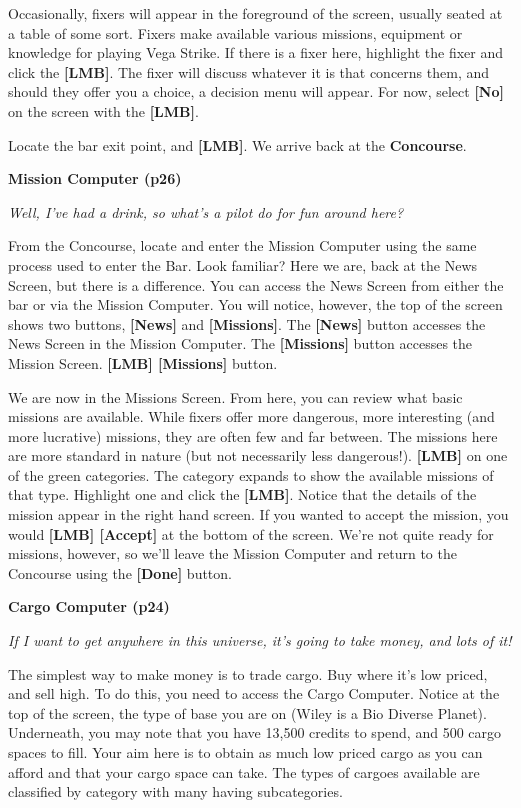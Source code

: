 \documentclass{article}
\begin{document}
Occasionally, fixers will appear in the foreground of the screen, usually seated at a table of some sort. Fixers make available various missions, equipment or knowledge for playing Vega Strike. If there is a fixer here, highlight the fixer and click the \textbf{[LMB]}. The fixer will discuss whatever it is that concerns them, and should they offer you a choice, a decision menu will appear.  For now, select \textbf{[No] }on the screen with the \textbf{[LMB]}. 

Locate the bar exit point, and \textbf{[LMB]}. We arrive back at the \textbf{Concourse}. 

\textbf{}

\textbf{Mission Computer (p26) }

\textit{Well, I've had a drink, so what's a pilot do for fun around here? }

From the Concourse, locate and enter the Mission Computer using the same process used to enter the Bar. Look familiar? Here we are, back at the News Screen, but there is a difference. You can access the News Screen from either the bar or via the Mission Computer. You will notice, however, the top of the screen shows two buttons, \textbf{[News] }and \textbf{[Missions]}. The \textbf{[News] }button accesses the News Screen in the Mission Computer. The \textbf{[Missions]} button accesses the Mission Screen.  \textbf{[LMB] [Missions]} button. 

We are now in the Missions Screen. From here, you can review what basic missions are available. While fixers offer more dangerous, more interesting (and more lucrative) missions, they are often few and far between. The missions here are more standard in nature (but not necessarily less dangerous!). \textbf{[LMB] }on one of the green categories. The category expands to show the available missions of that type. Highlight one and click the \textbf{[LMB]}. Notice that the details of the mission appear in the right hand screen. If you wanted to accept the mission, you would \textbf{[LMB] [Accept] }at the bottom of the screen. We're not quite ready for missions, however, so we'll leave the Mission Computer and return to the Concourse using the \textbf{[Done]} button. 

\textbf{}

\textbf{Cargo Computer (p24) }

\textit{If I want to get anywhere in this universe, it's going to take money, and lots of it! }

The simplest way to make money is to trade cargo.  Buy where it's low priced, and sell high.  To do this, you need to access the Cargo Computer. Notice at the top of the screen, the type of base you are on (Wiley is a Bio Diverse Planet). Underneath, you may note that you have 13,500 credits to spend, and 500 cargo spaces to fill. Your aim here is to obtain as much low priced cargo as you can afford and that your cargo space can take. The types of cargoes available are classified by category with many having subcategories. 
\end{document}
